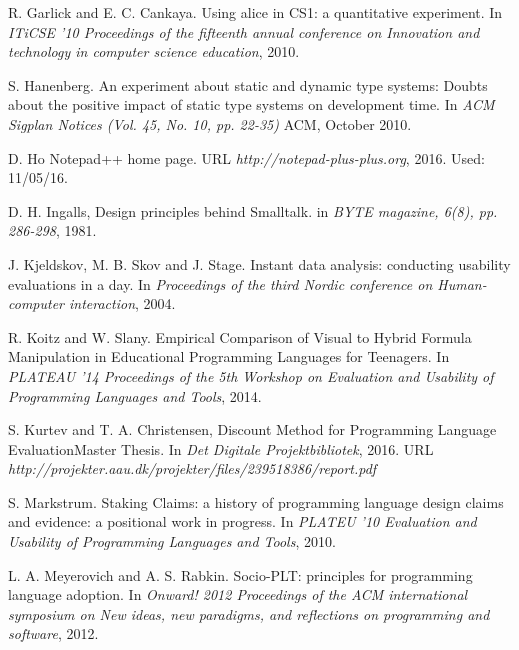 \documentclass[preprint,10pt]{sigplanconf}
\begin{document}
\begin{thebibliography}{}
R. Garlick and E. C. Cankaya. \newblock Using alice in CS1: a quantitative experiment. \newblock In \emph{ITiCSE '10 Proceedings of the fifteenth annual conference on Innovation and technology in computer science education}, 2010.

S. Hanenberg. \newblock An experiment about static and dynamic type systems: Doubts about the positive impact of static type systems on development time. \newblock In \emph{ACM Sigplan Notices (Vol. 45, No. 10, pp. 22-35)} ACM, October 2010.

D. Ho \newblock Notepad++ home page. \newblock URL \emph{http://notepad-plus-plus.org}, 2016. \newblock Used: 11/05/16.

D. H. Ingalls,  \newblock Design principles behind Smalltalk. \newblock in \emph{BYTE magazine, 6(8), pp. 286-298}, 1981. 

J. Kjeldskov, M. B. Skov and J. Stage. \newblock Instant data analysis: conducting usability evaluations in a day. \newblock In \emph{Proceedings of the third Nordic conference on Human-computer interaction}, 2004.

R. Koitz and W. Slany. \newblock Empirical Comparison of Visual to Hybrid Formula Manipulation in Educational Programming Languages for Teenagers. \newblock In \emph{PLATEAU '14 Proceedings of the 5th Workshop on Evaluation and Usability of Programming Languages and Tools}, 2014.

S. Kurtev and T. A. Christensen, \newblock Discount Method for Programming Language Evaluation\newblock Master Thesis. In \emph{Det Digitale Projektbibliotek}, 2016.
\newblock URL \emph{http://projekter.aau.dk/projekter/files/239518386/report.pdf}

S. Markstrum. \newblock Staking Claims: a history of programming language design claims and evidence: a positional work in progress. \newblock In \emph{PLATEU '10 Evaluation and Usability of Programming Languages and Tools}, 2010.

L. A. Meyerovich and A. S. Rabkin. \newblock Socio-PLT: principles for programming language adoption. \newblock In \emph{Onward! 2012 Proceedings of the ACM international symposium on New ideas, new paradigms, and reflections on programming and software}, 2012.


\end{thebibliography}
\end{document}
